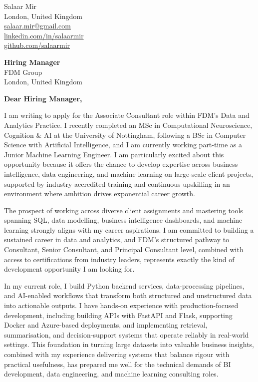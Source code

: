 \documentclass[a4paper,10pt]{article}
\begin{document}
\begin{flushright}
{\small
Salaar Mir \\
London, United Kingdom \\
\href{mailto:salaar.mir@gmail.com}{salaar.mir@gmail.com} \\
\href{https://www.linkedin.com/in/salaarmir}{linkedin.com/in/salaarmir} \\
\href{https://github.com/salaarmir}{github.com/salaarmir}
}
\end{flushright}

\vspace{8mm}

\begin{flushleft}
{\small
\textbf{Hiring Manager} \\
FDM Group \\
London, United Kingdom
}
\end{flushleft}

\vspace{4mm}

\textbf{Dear Hiring Manager,}

I am writing to apply for the Associate Consultant role within FDM's Data and Analytics Practice. I recently completed an MSc in Computational Neuroscience, Cognition \& AI at the University of Nottingham, following a BSc in Computer Science with Artificial Intelligence, and I am currently working part-time as a Junior Machine Learning Engineer. I am particularly excited about this opportunity because it offers the chance to develop expertise across business intelligence, data engineering, and machine learning on large-scale client projects, supported by industry-accredited training and continuous upskilling in an environment where ambition drives exponential career growth.

The prospect of working across diverse client assignments and mastering tools spanning SQL, data modelling, business intelligence dashboards, and machine learning strongly aligns with my career aspirations. I am committed to building a sustained career in data and analytics, and FDM's structured pathway to Consultant, Senior Consultant, and Principal Consultant level, combined with access to certifications from industry leaders, represents exactly the kind of development opportunity I am looking for.

In my current role, I build Python backend services, data-processing pipelines, and AI-enabled workflows that transform both structured and unstructured data into actionable outputs. I have hands-on experience with production-focused development, including building APIs with FastAPI and Flask, supporting Docker and Azure-based deployments, and implementing retrieval, summarisation, and decision-support systems that operate reliably in real-world settings. This foundation in turning large datasets into valuable business insights, combined with my experience delivering systems that balance rigour with practical usefulness, has prepared me well for the technical demands of BI development, data engineering, and machine learning consulting roles.
\end{document}
